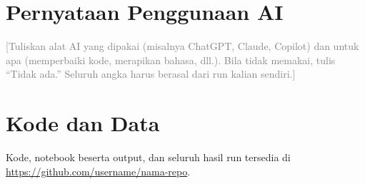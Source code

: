 \documentclass[conference,a4paper]{IEEEtran}
\newcommand{\petunjuk}[1]{\textcolor{gray}{[#1]}}
\begin{document}
\section*{Pernyataan Penggunaan AI}
\petunjuk{Tuliskan alat AI yang dipakai (misalnya ChatGPT, Claude, Copilot) dan untuk apa (memperbaiki kode, merapikan bahasa, dll.). Bila tidak memakai, tulis ``Tidak ada.'' Seluruh angka harus berasal dari run kalian sendiri.}

\section*{Kode dan Data}
Kode, notebook beserta output, dan seluruh hasil run tersedia di \url{https://github.com/username/nama-repo}.



\end{document}
